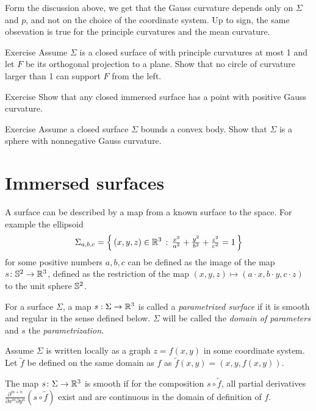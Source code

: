 Form the discussion above, 
we get that the Gauss curvature depends only on $\Sigma$ and $p$,
and not on the choice of the coordinate system.
Up to sign, the same obsevation is true for the principle curvatures and the mean curvature. 


\begin{thm}{Exercise}\label{ex:projection}
Assume $\Sigma$ is a closed surface of with principle curvatures at most 1
and let $F$ be its orthogonal projection to a plane.
Show that no circle of curvature larger than 1 can support $F$ from the left. %
\end{thm}

\begin{thm}{Exercise}
Show that any closed immersed surface has a point with positive Gauss curvature.
\end{thm}

\begin{thm}{Exercise}
Assume a closed surface $\Sigma$ bounds a convex body.
Show that $\Sigma$ is a sphere with nonnegative Gauss curvature. 
\end{thm}

\section{Immersed surfaces}

A surface can be described by a map from a known surface to the space.
For example the ellipsoid
\[\Sigma_{a,b,c}=\left\{\,{(x,y,z)\in\mathbb{R}^3}\,:\,{\tfrac{x^2}{a^2}+\tfrac{y^2}{b^2}+\tfrac{z^2}{c^2}=1}\,\right\}\]
for some positive numbers $a,b,c$ can be defined as the image of the map $s\colon\mathbb{S}^2\to\mathbb{R}^3$, defined as the restriction of the map $(x,y,z)\mapsto (a\cdot x, b\cdot y,c\cdot z)$ to the unit sphere $\mathbb{S}^2$.

For a surface $\Sigma$, a map $s: \Sigma \to \mathbb{R} ^3$ is called a 
\emph{parametrized surface} if it is smooth and regular in the sense defined below. 
$\Sigma$ will be called the \emph{domain of parameters} and $s$ the \emph{parametrization}.

Assume $\Sigma$ is written locally as a graph $z=f(x,y)$ in some coordinate system. Let $\tilde{f} $ be defined on the same domain as $f$ as $\tilde{f}(x,y) = (x,y, f(x,y))$.

The map $s\colon\Sigma \to \mathbb{R}^3$ is  smooth if for the composition $s\circ \tilde{f}$, all partial derivatives $\frac{\partial^{m+n}}{\partial x^m\partial y^n}(s\circ \tilde{f})$ exist and are continuous in the domain of definition of $f$.

